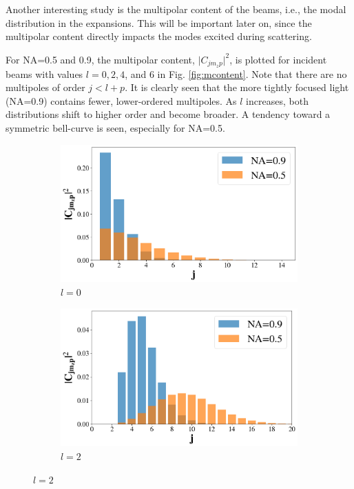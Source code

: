 Another interesting study is the multipolar content of the beams, i.e., the modal distribution in the expansions. This will be important later on, since the multipolar content directly impacts the modes excited during scattering.

For NA=0.5 and 0.9, the multipolar content, \( \lvert C_{jm_z p} \rvert^2 \), is plotted for incident beams with values \( l=0, 2, 4 \), and 6 in Fig. \ref{fig:mcontent}. Note that there are no multipoles of order \( j < l + p \). 
It is clearly seen that the more tightly focused light (NA=0.9) contains fewer, lower-ordered multipoles. As \( l \) increases, both distributions shift to higher order and become broader. A tendency toward a symmetric bell-curve is seen, especially for NA=0.5.

\begin{figure}
    \begin{subfigure}[b]{0.49\textwidth}
        \centering
        \includegraphics[width=\textwidth]{Figures/contentl0.png}
        \caption{\( l=0 \)}
        \label{fig:aa}
    \end{subfigure}
    \begin{subfigure}[b]{0.49\textwidth}
        \includegraphics[width=\textwidth]{Figures/contentl2.png}
        \caption{\( l=2 \)}
        \label{fig:bb}
    \end{subfigure}


\end{figure}
